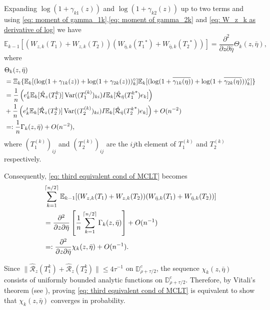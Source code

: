 \documentclass[12pt]{amsart}
\theoremstyle{plain}
\theoremstyle{definition}
\newcommand{\conjugate}{{\operatorname{^*}}}
\newcommand{\Var}{\operatorname{Var}}
\begin{document}
Expanding $\operatorname{\log}(1+\gamma_{k1}(z))$ and $\operatorname{\log}(1+\gamma_{k2}(z))$ up to two terms and using \eqref{eq: moment of gamma_1k},\eqref{eq: moment of gamma_2k} and \eqref{eq: W_z_k as derivative of log} we have
$$
\mathbb{E}_{k-1}[(W_{z,k}(T_1)+W_{z,k}(T_2))(W_{\bar{\eta},k}(T_1\conjugate)+W_{\bar{\eta},k}(T_2\conjugate))] = \frac{\partial^2}{\partial z \partial \bar{\eta}}\Theta_{k}(z,\bar{\eta}),
$$
where 
\begin{align}
    &\Theta_{k}(z,\bar{\eta})\notag\\
    &= \Xi_{k}\{\mathbb{E}_k[(\log(1+\gamma_{1k}(z))+\log(1+\gamma_{2k}(z)))_k^\circ]\mathbb{E}_k[(\log(1+\overline{\gamma_{1k}(\eta)})+\log(1+\overline{\gamma_{2k}(\eta)}))_k^\circ]\}\notag\\
    &= \frac{1}{n}\left(e_k^t \mathbb{E}_k [\hat{\mathcal{R}}_{z}(T_1^k)]\Var((T_{1}^{(k)})_{ki})I\mathbb{E}_k [\hat{\mathcal{R}}_{\bar{\eta}}(T_1^k\conjugate)e_k]\right)\notag\\
    &+\frac{1}{n}\left(e_k^t \mathbb{E}_k [\hat{\mathcal{R}}_{z}(T_2^k)]\Var((T_{2}^{(k)})_{ki})I\mathbb{E}_k [\hat{\mathcal{R}}_{\bar{\eta}}(T_2^k\conjugate)e_k]\right)+O(n^{-2})\notag\\
    &=: \frac{1}{n}\Gamma_{k}(z,\bar{\eta})+O(n^{-2})\notag,
\end{align}
where $(T_{1}^{(k)})_{ij}$ and $(T_{2}^{(k)})_{ij}$ are the $ij$th element of $T_{1}^{(k)}$ and $T_{2}^{(k)}$ respectively.


Consequently, \eqref{eq: third equivalent cond of MCLT} becomes
\begin{align}
    &\sum_{k=1}^{\lceil n/2 \rceil}\mathbb{E}_{k-1}[(W_{z,k}(T_1)+W_{z,k}(T_2))(W_{\bar{\eta},k}(T_1)+W_{\bar{\eta},k}(T_2))]\notag\\
    &= \frac{\partial^2}{\partial z \partial \bar{\eta}}\left[\frac{1}{n}\sum _{k=1}^{\lceil n/2 \rceil}\Gamma_{k}(z,\bar{\eta})\right]+O(n^{-1}) \notag\\
    &=: \frac{\partial^2}{\partial z \partial \bar{\eta}}\chi_{k}(z,\bar{\eta})+O(n^{-1})\label{eqn: definition of chi}.
\end{align}


Since $\|\hat{\mathcal{R}}_z(T_1^k) + \hat{\mathcal{R}}_z(T_2^k)\| \leq 4\tau^{-1}$ on $\mathbb{D}_{\rho + \tau/2}^c$, the sequence $\chi_{k}(z, \bar{\eta})$ consists of uniformly bounded analytic functions on $\mathbb{D}_{\rho + \tau/2}^c$. Therefore, by Vitali's theorem (see \cite[Section 2.9]{conway2012functions}), proving \eqref{eq: third equivalent cond of MCLT} is equivalent to show that $\chi_{k}(z, \bar{\eta})$ converges in probability.
\end{document}
